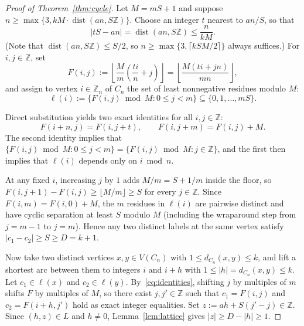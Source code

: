 \documentclass[11pt]{article}
\begin{document}
\begin{proof}[Proof of Theorem~\ref{thm:cycle}]
Let $M = mS + 1$ and suppose $n \ge \max\{3, kM \cdot \operatorname{dist}(an, S\mathbb{Z})\}$. Choose an integer $t$ nearest to $an/S$, so that
\[
|tS - an| = \operatorname{dist}(an, S\mathbb{Z}) \le \frac{n}{kM}.
\]
(Note that $\operatorname{dist}(an, S\mathbb{Z}) \le S/2$, so $n \ge \max\{3, \lceil kSM/2 \rceil\}$ always suffices.) For $i, j \in \mathbb{Z}$, set
\[
F(i, j) := \left\lfloor \frac{M}{m}\left(\frac{ti}{n} + j\right) \right\rfloor = \left\lfloor \frac{M(ti + jn)}{mn} \right\rfloor,
\]
and assign to vertex $i \in \mathbb{Z}_n$ of $C_n$ the set of least nonnegative residues modulo $M$:
\[
\ell(i) := \{F(i, j) \bmod M : 0 \le j < m\} \subseteq \{0, 1, \dots, mS\}.
\]

Direct substitution yields two exact identities for all $i, j \in \mathbb{Z}$:
\begin{equation}\label{eq:identities}
F(i + n, j) = F(i, j + t), \qquad F(i, j + m) = F(i, j) + M.
\end{equation}
The second identity implies that $\{F(i, j) \bmod M : 0 \le j < m\} = \{F(i, j) \bmod M : j \in \mathbb{Z}\}$, and the first then implies that $\ell(i)$ depends only on $i \bmod n$.

At any fixed $i$, increasing $j$ by $1$ adds $M/m = S + 1/m$ inside the floor, so $F(i, j+1) - F(i, j) \ge \lfloor M/m \rfloor \ge S$ for every $j \in \mathbb{Z}$. Since $F(i, m) = F(i, 0) + M$, the $m$ residues in $\ell(i)$ are pairwise distinct and have cyclic separation at least $S$ modulo $M$ (including the wraparound step from $j = m-1$ to $j = m$). Hence any two distinct labels at the same vertex satisfy $|c_1 - c_2| \ge S \ge D = k + 1$.

Now take two distinct vertices $x, y \in V(C_n)$ with $1 \le d_{C_n}(x, y) \le k$, and lift a shortest arc between them to integers $i$ and $i + h$ with $1 \le |h| = d_{C_n}(x, y) \le k$. Let $c_1 \in \ell(x)$ and $c_2 \in \ell(y)$. By~\eqref{eq:identities}, shifting $j$ by multiples of $m$ shifts $F$ by multiples of $M$, so there exist $j, j' \in \mathbb{Z}$ such that $c_1 = F(i, j)$ and $c_2 = F(i + h, j')$ hold as exact integer equalities. Set $z := ah + S(j' - j) \in \mathbb{Z}$. Since $(h, z) \in L$ and $h \neq 0$, Lemma~\ref{lem:lattice} gives $|z| \ge D - |h| \ge 1$.


\end{proof}
\end{document}
